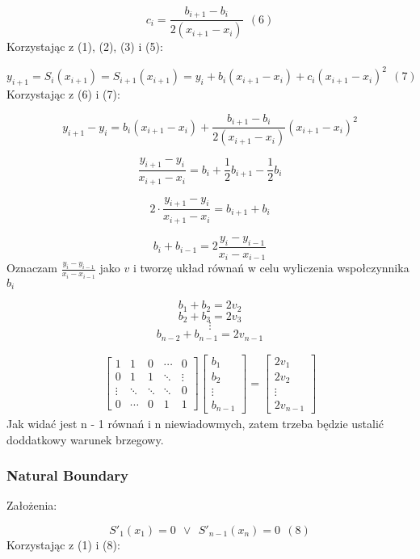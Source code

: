 \documentclass{article}
\begin{document}
\[c_i = \frac{b_{i+1}-b_i}{2(x_{i+1}-x_i)} \ \ (6)\] 
\noindent
Korzystając z (1), (2), (3) i (5):

\[y_{i+1} = S_i(x_{i+1}) = S_{i+1}(x_{i+1}) = y_i + b_i(x_{i+1} - x_i) + c_i(x_{i+1}-x_i)^2 \ \ (7)\]
\noindent
Korzystając z (6) i (7):

\[y_{i+1} - y_i = b_i(x_{i+1}-x_i) + \frac{b_{i+1}-b_i}{2(x_{i+1}-x_i)}(x_{i+1}-x_i)^2\]

\[\frac{y_{i+1} - y_i}{x_{i+1}-x_i} = b_i + \frac{1}{2}b_{i+1} - \frac{1}{2}b_i\]

\[2\cdot \frac{y_{i+1} - y_i}{x_{i+1}-x_i} = b_{i+1}+b_i\]

\[b_i + b_{i-1} = 2\frac{y_i - y_{i-1}}{x_i - x_{i-1}}\]
\noindent
Oznaczam \(\frac{y_i - y_{i-1}}{x_i - x_{i-1}}\) jako \(v\) i tworzę układ równań w celu wyliczenia
wspołczynnika \(b_i\)

\bigbreak

\[b_1 + b_2 = 2v_2\]
\[b_2 + b_3 = 2v_3\]
\[\vdots\]
\[b_{n-2}+b_{n-1}=2v_{n-1}\]

\begin{gather*}
\begin{bmatrix}
1 & 1 & 0 & \cdots & 0 \\
0 & 1 & 1 & \ddots & \vdots \\
\vdots & \ddots & \ddots & \ddots & 0 \\
0 & \cdots & 0 & 1 & 1 
\end{bmatrix}  
\begin{bmatrix}
b_1 \\
b_2 \\
\vdots \\
b_{n-1} 
\end{bmatrix} 
=
\begin{bmatrix}
2v_1 \\
2v_2 \\
\vdots \\
2v_{n-1} 
\end{bmatrix}
\end{gather*}
\noindent
Jak widać jest n - 1 równań i n niewiadowmych, zatem trzeba będzie ustalić doddatkowy warunek brzegowy.

\subsubsection{Natural Boundary}

Założenia:

\[S'_1(x_1) = 0 \ \ \vee \ \ S'_{n-1}(x_n) = 0 \ \ (8)\]
\noindent
Korzystając z (1) i (8):
\end{document}
